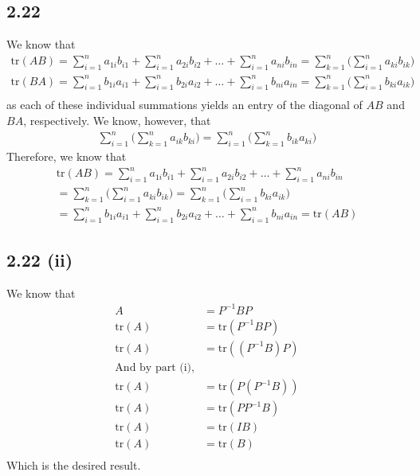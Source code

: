 \documentclass[letterpaper,12pt]{article}
\theoremstyle{definition}
\begin{document}
\subsection*{2.22}
We know that
\begin{align*}
    \text{tr} (AB) = \sum^{n}_{i=1} a_{1i} b_{i1} +\sum^{n}_{i=1} a_{2i} b_{i2} +\dots +\sum^{n}_{i=1} a_{ni} b_{in}= \sum^{n}_{k=1} \Big( \sum^{n}_{i=1} a_{ki} b_{ik} \Big)\\
    \text{tr} (BA) = \sum^{n}_{i=1} b_{1i} a_{i1} +\sum^{n}_{i=1} b_{2i} a_{i2} +\dots +\sum^{n}_{i=1} b_{ni} a_{in} = \sum^{n}_{k=1} \Big( \sum^{n}_{i=1} b_{ki} a_{ik} \Big)\\
\end{align*}
as each of these individual summations yields an entry of the diagonal of $AB$ and $BA$, respectively. We know, however, that 
\begin{align*}
    \sum^{n}_{i=1} \Big( \sum^{n}_{k=1} a_{ik}b_{ki}\Big) =
    \sum^{n}_{i=1} \Big( \sum^{n}_{k=1} b_{ik}a_{ki}\Big)
\end{align*}
Therefore, we know that 
\begin{align*}
    \text{tr} (AB) = \sum^{n}_{i=1} a_{1i} b_{i1} +\sum^{n}_{i=1} a_{2i} b_{i2} +\dots +\sum^{n}_{i=1} a_{ni} b_{in} \\= \sum^{n}_{k=1}\Big( \sum^{n}_{i=1} a_{ki} b_{ik} \Big) = \sum^{n}_{k=1} \Big( \sum^{n}_{i=1} b_{ki} a_{ik} \Big)
    \\= \sum^{n}_{i=1} b_{1i} a_{i1} +\sum^{n}_{i=1} b_{2i} a_{i2} +\dots +\sum^{n}_{i=1} b_{ni} a_{in} = \text{tr} (AB)
\end{align*}
\subsection*{2.22 (ii)}
We know that 
\begin{align*}
    A&=P^{-1}BP\\
    \text{tr} (A) &=\text{tr} ( P^{-1}BP)\\
    \text{tr} (A) &=\text{tr} ( (P^{-1}B)P)\\
    \text{And by part (i),} \\
    \text{tr} (A) &=\text{tr} ( P(P^{-1}B))\\
    \text{tr} (A) &=\text{tr} ( PP^{-1}B)\\
    \text{tr} (A) &=\text{tr} ( IB)\\
    \text{tr} (A) &=\text{tr} ( B)\\
\end{align*}
Which is the desired result.
\end{document}
